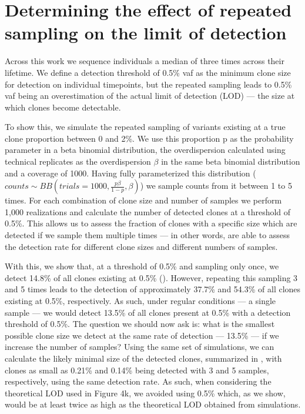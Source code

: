 \chapter{Determining the effect of repeated sampling on the limit of detection}
\label{appendix:theoretical-lod}

Across this work we sequence individuals a median of three times across their lifetime. We define a detection threshold of 0.5\% \ac{vaf} as the minimum clone size for detection on individual timepoints, but the repeated sampling leads to 0.5\% \ac{vaf} being an overestimation of the actual limit of detection (LOD) --- the size at which clones become detectable.

To show this, we simulate the repeated sampling of variants existing at a true clone proportion between 0 and 2\%. We use this proportion p as the probability parameter in a beta binomial distribution, the overdispersion  calculated using technical replicates as the overdispersion $\beta$ in the same beta binomial distribution and a coverage of 1000. Having fully parameterized this distribution ($counts \sim BB(trials=1000,\frac{p\beta}{1-p},\beta)$) we sample counts from it between 1 to 5 times. For each combination of clone size and number of samples we perform 1,000 realizations and calculate the number of detected clones at a threshold of 0.5\%. This allows us to assess the fraction of clones with a specific size which are detected if we sample them multiple times --- in other words, are able to assess the detection rate for different clone sizes and different numbers of samples.

With this, we show that, at a threshold of 0.5\% and sampling only once, we detect 14.8\% of all clones existing at 0.5\% (). However, repeating this sampling 3 and 5 times leads to the detection of approximately 37.7\% and 54.3\% of all clones existing at 0.5\%, respectively. As such, under regular conditions --- a single sample --- we would detect 13.5\% of all clones present at 0.5\% with a detection threshold of 0.5\%. The question we should now ask is: what is the smallest possible clone size we detect at the same rate of detection --- 13.5\% --- if we increase the number of samples? Using the same set of simulations, we can calculate the likely minimal size of the detected clones, summarized in , with clones as small as 0.21\% and 0.14\% being detected with 3 and 5 samples, respectively, using the same detection rate. As such, when considering the theoretical LOD used in Figure 4k, we avoided using 0.5\% which, as we show, would be at least twice as high as the theoretical LOD obtained from simulations.


